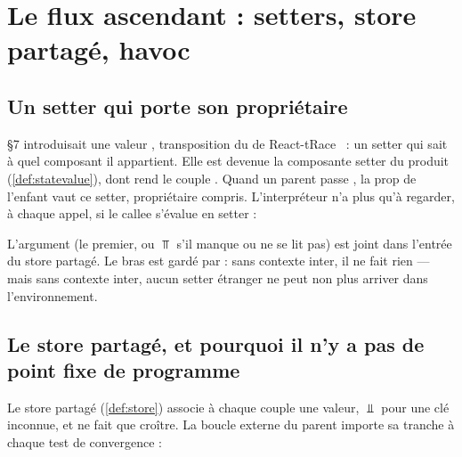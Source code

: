 \section{Le flux ascendant : setters, store partagé, havoc}
\label{sec:inter-composants-ascendant}

\subsection{Un setter qui porte son propriétaire}

 §7 introduisait une valeur , transposition
du  de React-tRace~\cite{LeeAhnYi2025} : un setter qui sait à
quel composant il appartient. Elle est devenue la composante setter du produit
 (\cref{def:statevalue}), dont  rend le couple
. Quand un parent passe , la prop  de
l'enfant vaut ce setter, propriétaire compris. L'interpréteur n'a plus qu'à regarder, à chaque
appel, si le callee s'évalue en setter :


L'argument (le premier, ou $\Top$ s'il manque ou ne se lit pas) est joint dans l'entrée
 du store partagé. Le bras est gardé par  :
sans contexte inter, il ne fait rien --- mais sans contexte inter, aucun setter étranger ne
peut non plus arriver dans l'environnement.

\subsection{Le store partagé, et pourquoi il n'y a pas de point fixe de programme}


Le store partagé (\cref{def:store}) associe à chaque couple  une
valeur, $\Bot$ pour une clé inconnue, et ne fait que croître. La boucle externe du parent
importe sa tranche à chaque test de convergence :


